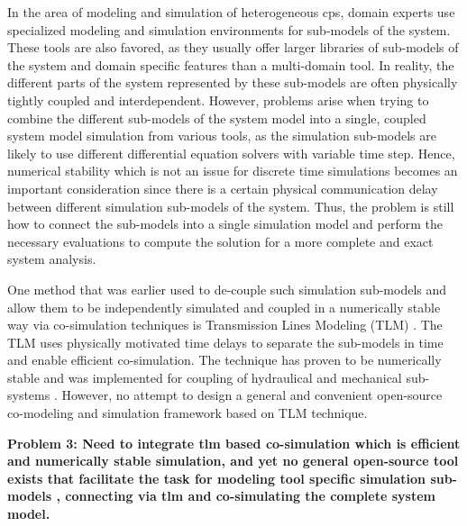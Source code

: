 In the area of modeling and simulation of heterogeneous \acrshort{cps}, domain experts use specialized modeling and simulation environments for sub-models of the system. These tools are also favored, as they usually offer larger libraries of sub-models of the system and domain specific features than a multi-domain tool. In reality, the different parts of the system represented by these sub-models are often physically tightly coupled and interdependent. However, problems arise when trying to combine the different sub-models of the system model into a single, coupled system model simulation from various tools, as the simulation sub-models are likely to use different differential equation solvers with variable time step. Hence, numerical stability which is not an issue for discrete time simulations becomes an important consideration since there is a certain physical communication delay between different simulation sub-models of the system. Thus, the problem is still how to connect the sub-models into a single simulation model and perform the necessary evaluations to compute the solution for a more complete and exact system analysis. 

One method that was earlier used to de-couple such simulation sub-models and allow them to be independently simulated and coupled in a numerically stable way via co-simulation techniques is Transmission Lines Modeling (TLM) \cite{tlmkurs90,tlmkurs99,tlmcogan,tlmjohns}. The TLM uses physically motivated time delays to separate the sub-models in time and enable efficient co-simulation. The technique has proven to be numerically stable and was implemented for coupling of hydraulical and mechanical sub-systems \cite{tlmkurs90,tlmkurs99}. However, no attempt to design a general and convenient open-source co-modeling and simulation framework based on TLM technique. 

\begin{description}

\item \textbf{Problem 3: Need to integrate \acrshort{tlm} based co-simulation which is  efficient and numerically stable simulation, and yet no general open-source  tool exists that facilitate the task  for modeling tool specific simulation sub-models , connecting via \acrshort{tlm}  and co-simulating the complete system model.}

\end{description}

